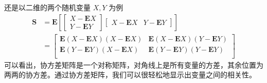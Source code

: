 还是以二维的两个随机变量 $X,Y$ 为例
$$
\begin{aligned}
	\mathbf S&=\mathbf E[\begin{bmatrix}X-\mathbf E X\\Y-\mathbf E Y\end{bmatrix}
	\begin{bmatrix}X-\mathbf E X&Y-\mathbf E Y\end{bmatrix}]\\&=
	\begin{bmatrix}
		\mathbf E(X-\mathbf E X)(X-\mathbf E X)&\mathbf E(X-\mathbf E X)(Y-\mathbf E Y)\\
		\mathbf E(Y-\mathbf E Y)(X-\mathbf E X)&\mathbf E(Y-\mathbf E Y)(Y-\mathbf E Y)\\
	\end{bmatrix}
\end{aligned}
$$
可以看出，协方差矩阵是一个对称矩阵，对角线上是所有变量的方差，其余位置为两两的协方差。通过协方差矩阵，我们可以很轻松地显示出变量之间的相关性。